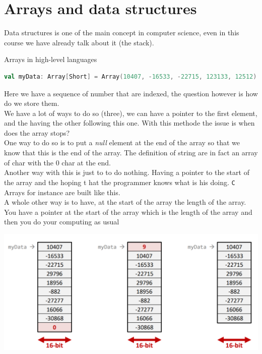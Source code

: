 \section{Arrays and data structures}
Data structures is one of the main concept in computer science, even in this course we have already talk about it (the stack).\\
\begin{parag}{Arrays in high-level languages}
	\begin{lstlisting}[language=Scala]
val myData: Array[Short] = Array(10407, -16533, -22715, 123133, 12512)
    \end{lstlisting}
\end{parag}
Here we have a sequence of number that are indexed, the question however is how do we store them.\\
We have a lot of ways to do so (three), we can have a pointer to the first element, and the having the other following this one. With this methode the issue is when does the array stops?\\
One way to do so is to put a \textit{null} element at the end of the array so that we know that this is the end of the array.  The definition of string are in fact an array of char with the 0 char at the end.\\
Another way with this is just to to do nothing. Having a pointer to the start of the array and the hoping t hat the programmer knows what is his doing. \texttt{C} Arrays for instance are built like this.\\
A whole other way is to have, at the start of the array the length of the array. You have a pointer at the start of the array which is the length of the array and then you do your computing as usual
\begin{center}
\includegraphics[scale=0.3]{screenshots/2025-10-21.png}
\end{center}
